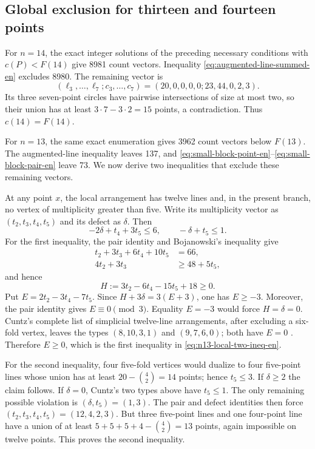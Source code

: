 \subsection{Global exclusion for thirteen and fourteen points}

For $n=14$, the exact integer solutions of the preceding necessary
conditions with $c(P)<F(14)$ give 8981 count vectors.  Inequality
\eqref{eq:augmented-line-summed-en} excludes 8980.  The remaining vector is
\[
 (\ell_3,\ldots,\ell_7;c_3,\ldots,c_7)
 =(20,0,0,0,0;23,44,0,2,3).
\]
Its three seven-point circles have pairwise intersections of size at most two,
so their union has at least $3\cdot7-3\cdot2=15$ points, a contradiction.
Thus $c(14)=F(14)$.

For $n=13$, the same exact enumeration gives 3962 count vectors below $F(13)$.
The augmented-line inequality leaves 137, and
\eqref{eq:small-block-point-en}--\eqref{eq:small-block-pair-en} leave 73.  We
now derive two inequalities that exclude these remaining vectors.

At any point $x$, the local arrangement has twelve lines and, in the present
branch, no vertex of multiplicity greater than five.  Write its multiplicity
vector as $(t_2,t_3,t_4,t_5)$ and its defect as $\delta$.  Then
\begin{equation}\label{eq:n13-local-two-ineq-en}
 -2\delta+t_4+3t_5\le6,
 \qquad -\delta+t_5\le1.
\end{equation}
For the first inequality, the pair identity and Bojanowski's inequality give
\begin{align*}
 t_2+3t_3+6t_4+10t_5&=66,\\
 4t_2+3t_3&\ge48+5t_5,
\end{align*}
and hence
\[
 H:=3t_2-6t_4-15t_5+18\ge0.
\]
Put $E=2t_2-3t_4-7t_5$.  Since
$H+3\delta=3(E+3)$, one has $E\ge-3$.  Moreover, the pair identity gives
$E\equiv0\pmod3$.  Equality $E=-3$ would force $H=\delta=0$.
Cuntz's complete list of simplicial twelve-line arrangements, after excluding
a six-fold vertex, leaves the types $(8,10,3,1)$ and $(9,7,6,0)$; both have
$E=0$ \cite[Theorem~1.1 and the invariant tables]{cuntz-en}.  Therefore
$E\ge0$, which is the first inequality in \eqref{eq:n13-local-two-ineq-en}.

For the second inequality, four five-fold vertices would dualize to four
five-point lines whose union has at least $20-\binom42=14$ points; hence
$t_5\le3$.  If $\delta\ge2$ the claim follows.  If $\delta=0$, Cuntz's two
types above have $t_5\le1$.  The only remaining possible violation is
$(\delta,t_5)=(1,3)$.  The pair and defect identities then force
$(t_2,t_3,t_4,t_5)=(12,4,2,3)$.  But three five-point lines and one
four-point line have a union of at least $5+5+5+4-\binom42=13$ points, again
impossible on twelve points.  This proves the second inequality.

